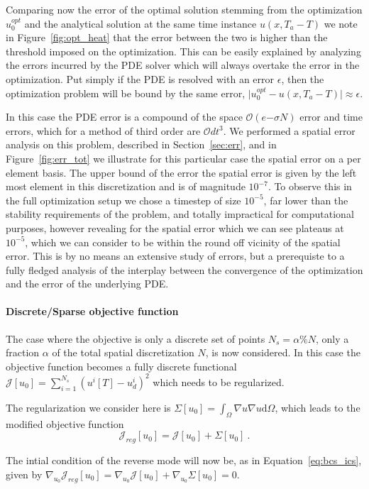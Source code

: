 \documentclass[10pt]{article}
\renewcommand{\d}{\mathrm{d}}
\begin{document}
{Comparing now the error of the optimal solution stemming from the optimization $u_0^{opt}$ and the analytical solution at the same time instance $u(x,T_a-T)$ we note in Figure~\ref{fig:opt_heat} that the error between the two is higher than the threshold imposed on the optimization. This can be easily explained by analyzing the errors incurred by the PDE solver which will always overtake the error in the optimization. Put simply if the PDE is resolved with an error $\epsilon$, then the optimization problem will be bound by the same error, $\vert u_0^{opt} -u(x,T_a-T)\vert \approx \epsilon $. 

In this case the PDE error is a compound of the space $\mathcal O(e{-\sigma N})$ error and time errors, which for a method of third order are $\mathcal O{dt^3}$. We performed a spatial error analysis on this problem, described in Section~\ref{sec:err}, and in Figure~\ref{fig:err_tot} we illustrate for this particular case the spatial error on a per element basis. The upper bound of the error the spatial error is given by the left most element in this discretization and is of magnitude $10^{-7}$. To observe this in the full optimization setup we chose a timestep of size $10^{-5}$, far lower than the stability requirements of the problem, and totally impractical for computational purposes, however revealing for the spatial error which we can see plateaus at $10^{-5}$, which we can consider to be within the round off vicinity of the spatial error. This is by no means an extensive study of errors, but a prerequiste to a fully fledged analysis of the interplay between the convergence of the optimization and the error of the underlying PDE.

\paragraph{Discrete/Sparse objective function}
The case where the objective is only a discrete set of points $N_s=\alpha\%N$, only a fraction $\alpha$ of the total spatial discretization $N$, is now considered. In this case the objective function becomes a fully discrete functional
$\mathcal J[u_0]=\sum_{i=1}^{N_s} (u^i[T]-u^i_d)^2 $ which needs to be regularized.

The regularization we consider here is 
$\Sigma[u_0]=\int_{\Omega} \nabla u \nabla u \d\Omega$, which leads to the modified objective function
$$\mathcal J_{reg}[u_0]= \mathcal J[u_0]+\Sigma[u_0] \ .$$

The intial condition of the reverse mode will now be, as in Equation~\ref{eq:bcs_ics}, given by $\nabla_{u_0} \mathcal J_{reg}[u_0] =\nabla_{u_0} \mathcal J[u_0]+\nabla_{u_0} \Sigma[u_0]=0 $.

}
\end{document}
